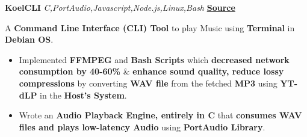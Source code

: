 {\textbf{KoelCLI}} {\sl C,PortAudio,Javascript,Node.js,Linux,Bash} \hfill \textbf{\href{https://github.com/zakhaev26/FeatherCLI}{\textbf{\textcolor{linkcolor}{Source}}}}

A \textbf{Command Line Interface (CLI) Tool} to play Music using \textbf{Terminal} in \textbf{Debian OS}.
\vspace{-0.6em}
\begin{itemize}
    \itemsep-0.2em
    \item Implemented \textbf{FFMPEG} and \textbf{Bash Scripts} which \textbf{decreased network consumption by 40-60\%} \& \textbf{enhance sound quality, reduce lossy compressions} by converting \textbf{WAV file} from the fetched \textbf{MP3} using \textbf{YT-dLP} in the \textbf{Host's System}.
    \item Wrote an \textbf{Audio Playback Engine, entirely in C} that \textbf{consumes WAV files and plays low-latency Audio} using \textbf{PortAudio Library}. 
\end{itemize}
\vspace*{2mm}
